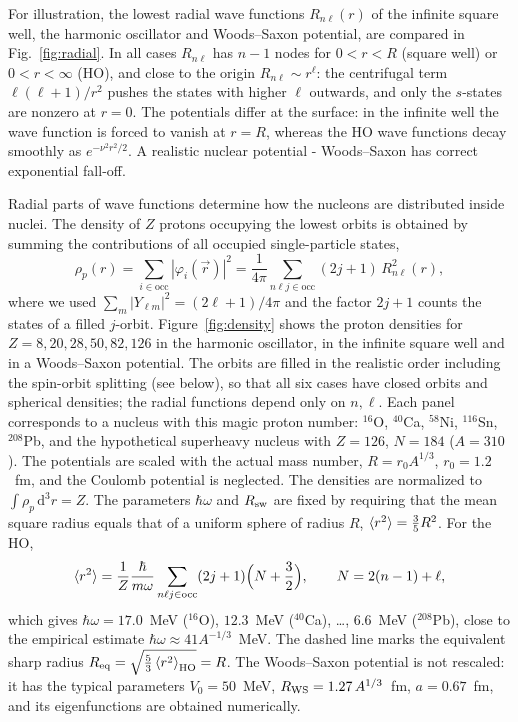 \documentclass[11pt,a4paper]{article}
\newcommand{\ud}{\mathrm{d}}
\begin{document}
\par
For illustration, the lowest radial wave functions $R_{n\ell}(r)$ of the infinite square well, the harmonic oscillator and Woods--Saxon potential, are compared in Fig.~\ref{fig:radial}. In all cases $R_{n\ell}$ has $n-1$ nodes for $0<r<R$ (square well) or $0<r<\infty$ (HO), and close to the origin $R_{n\ell}\sim r^\ell$: the centrifugal term $\ell(\ell+1)/r^2$ pushes the states with higher $\ell$ outwards, and only the $s$-states are nonzero at $r=0$. The potentials differ at the surface: in the infinite well the wave function is forced to vanish at $r=R$, whereas the HO wave functions decay smoothly as $e^{-\nu^2r^2/2}$. A realistic nuclear potential - Woods--Saxon has correct exponential fall-off.
\par
Radial parts of wave functions determine how the nucleons are distributed inside nuclei. The density of $Z$ protons occupying the lowest orbits is obtained by summing the contributions of all occupied single-particle states,
\[
\rho_p(r)=\sum_{i\in\text{occ}}|\varphi_i(\vec r)|^2=\frac{1}{4\pi}\sum_{n\ell j\in\text{occ}}(2j+1)\,R_{n\ell}^2(r),
\]
where we used $\sum_m|Y_{\ell m}|^2=(2\ell+1)/4\pi$ and the factor $2j+1$ counts the states of a filled $j$-orbit. Figure~\ref{fig:density} shows the proton densities for $Z=8,20,28,50,82,126$ in the harmonic oscillator, in the infinite square well and in a Woods--Saxon potential. The orbits are filled in the realistic order including the spin-orbit splitting (see below), so that all six cases have closed orbits and spherical densities; the radial functions depend only on $n,\ell$. Each panel corresponds to a nucleus with this magic proton number: $^{16}$O, $^{40}$Ca, $^{58}$Ni, $^{116}$Sn, $^{208}$Pb, and the hypothetical superheavy nucleus with $Z=126$, $N=184$ ($A=310$). The potentials are scaled with the actual mass number, $R=r_0A^{1/3}$, $r_0=1.2$~fm, and the Coulomb potential is neglected. The densities are normalized to $\int\rho_p\,\ud^3r=Z$. The parameters $\hbar\omega$ and $R_{\rm sw}$ are fixed by requiring that the mean square radius equals that of a uniform sphere of radius $R$, $\braket{r^2}=\frac35R^2$. For the HO,
\[
\braket{r^2}=\frac{1}{Z}\frac{\hbar}{m\omega}\sum_{n\ell j\in\text{occ}}(2j+1)\Big(N+\frac32\Big),
\qquad N=2(n-1)+\ell,
\]
which gives $\hbar\omega=17.0$~MeV ($^{16}$O), $12.3$~MeV ($^{40}$Ca), \dots, $6.6$~MeV ($^{208}$Pb), close to the empirical estimate $\hbar\omega\approx41A^{-1/3}$~MeV. The dashed line marks the equivalent sharp radius $R_{\rm eq}=\sqrt{\frac53\braket{r^2}_{\rm HO}}=R$. The Woods--Saxon potential is not rescaled: it has the typical parameters $V_0=50$~MeV, $R_{\rm WS}=1.27\,A^{1/3}$~fm, $a=0.67$~fm, and its eigenfunctions are obtained numerically.
\end{document}
